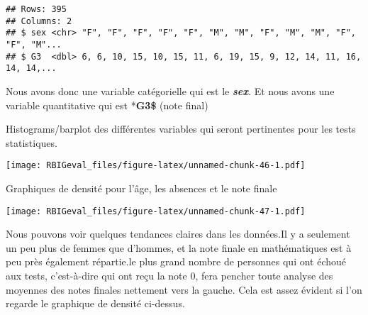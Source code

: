 \documentclass[
]{article}
\newenvironment{Shaded}{\begin{snugshade}}{\end{snugshade}}
\newcommand{\DataTypeTok}[1]{\textcolor[rgb]{0.13,0.29,0.53}{#1}}
\newcommand{\DecValTok}[1]{\textcolor[rgb]{0.00,0.00,0.81}{#1}}
\newcommand{\KeywordTok}[1]{\textcolor[rgb]{0.13,0.29,0.53}{\textbf{#1}}}
\newcommand{\NormalTok}[1]{#1}
\newcommand{\OperatorTok}[1]{\textcolor[rgb]{0.81,0.36,0.00}{\textbf{#1}}}
\newcommand{\StringTok}[1]{\textcolor[rgb]{0.31,0.60,0.02}{#1}}
\begin{document}
\begin{verbatim}
## Rows: 395
## Columns: 2
## $ sex <chr> "F", "F", "F", "F", "F", "M", "M", "F", "M", "M", "F", "F", "M"...
## $ G3  <dbl> 6, 6, 10, 15, 10, 15, 11, 6, 19, 15, 9, 12, 14, 11, 16, 14, 14,...
\end{verbatim}

Nous avons donc une variable catégorielle qui est le
\textbf{\emph{sex}}. Et nous avons une variable quantitative qui est
*\textbf{G3\$} (note final)

Histograms/barplot des différentes variables qui seront pertinentes pour
les tests statistiques.

\begin{Shaded}
\end{Shaded}

\texttt{[image: RBIGeval\_files/figure-latex/unnamed-chunk-46-1.pdf]}

Graphiques de densité pour l'âge, les absences et le note finale

\begin{Shaded}
\end{Shaded}

\texttt{[image: RBIGeval\_files/figure-latex/unnamed-chunk-47-1.pdf]}

Nous pouvons voir quelques tendances claires dans les données.Il y a
seulement un peu plus de femmes que d'hommes, et la note finale en
mathématiques est à peu près également répartie.le plus grand nombre de
personnes qui ont échoué aux tests, c'est-à-dire qui ont reçu la note 0,
fera pencher toute analyse des moyennes des notes finales nettement vers
la gauche. Cela est assez évident si l'on regarde le graphique de
densité ci-dessus.
\end{document}
